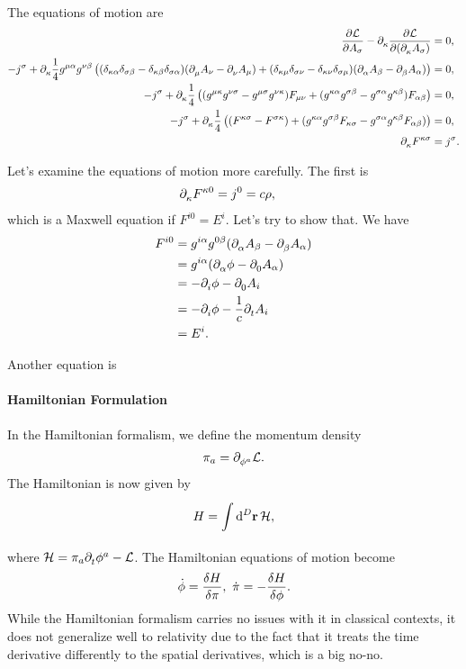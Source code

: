 The equations of motion are
\begin{align*}
	\pdv{\ensuremath{\mathcal{L}}}{A_{\sigma}} - \partial^{}_{\kappa}\pdv{\ensuremath{\mathcal{L}}}{(\partial^{}_{\kappa}A_{\sigma})} &= 0, \\
	-j^{\sigma} + \partial^{}_{\kappa}\frac{1}{4}g^{\mu\alpha}g^{\nu\beta}\left((\delta_{\kappa\alpha}\delta_{\sigma\beta} - \delta_{\kappa\beta}\delta_{\sigma\alpha})(\partial^{}_{\mu}A_{\nu} - \partial^{}_{\nu}A_{\mu}) + (\delta_{\kappa\mu}\delta_{\sigma\nu} - \delta_{\kappa\nu}\delta_{\sigma\mu})(\partial^{}_{\alpha}A_{\beta} - \partial^{}_{\beta}A_{\alpha})\right) &= 0, \\
	-j^{\sigma} + \partial^{}_{\kappa}\frac{1}{4}\left((g^{\mu\kappa}g^{\nu\sigma} - g^{\mu\sigma}g^{\nu\kappa})F_{\mu\nu} + (g^{\kappa\alpha}g^{\sigma\beta} - g^{\sigma\alpha}g^{\kappa\beta})F_{\alpha\beta}\right) &= 0, \\
	-j^{\sigma} + \partial^{}_{\kappa}\frac{1}{4}\left((F^{\kappa\sigma} - F^{\sigma\kappa}) + (g^{\kappa\alpha}g^{\sigma\beta}F_{\kappa\sigma} - g^{\sigma\alpha}g^{\kappa\beta}F_{\alpha\beta})\right) &= 0, \\
	\partial^{}_{\kappa}F^{\kappa\sigma} &= j^{\sigma}.
\end{align*}

Let's examine the equations of motion more carefully. The first is
\begin{align*}
	\partial^{}_{\kappa}F^{\kappa 0} &= j^{0} = c\rho,
\end{align*}
which is a Maxwell equation if $F^{i 0} = E^{i}$. Let's try to show that. We have
\begin{align*}
	F^{i0} &= g^{i\alpha}g^{0\beta}(\partial^{}_{\alpha}A_{\beta} - \partial^{}_{\beta}A_{\alpha}) \\
	       &= g^{i\alpha}(\partial^{}_{\alpha}\phi - \partial^{}_{0}A_{\alpha}) \\
	       &= -\partial^{}_{i}\phi - \partial^{}_{0}A_{i} \\
	       &= -\partial^{}_{i}\phi - \frac{1}{c}\partial^{}_{t}A_{i} \\
	       &= E^{i}.
\end{align*}

Another equation is

\paragraph{Hamiltonian Formulation}
In the Hamiltonian formalism, we define the momentum density
\begin{align*}
	\pi_{a} = \partial^{}_{\phi^{a}}\mathcal{L}.
\end{align*}
The Hamiltonian is now given by
\begin{align*}
	H = \int\limits_{}^{}\dd[D]{\vb{r}}\mathcal{H},
\end{align*}
where $\mathcal{H} = \pi_{a}\partial^{}_{t}\phi^{a} - \mathcal{L}$. The Hamiltonian equations of motion become
\begin{align*}
	\dot{\phi} = \fdv{H}{\pi},\ \dot{\pi} = -\fdv{H}{\phi}.
\end{align*}
While the Hamiltonian formalism carries no issues with it in classical contexts, it does not generalize well to relativity due to the fact that it treats the time derivative differently to the spatial derivatives, which is a big no-no.

